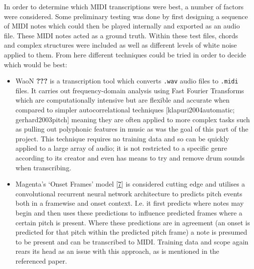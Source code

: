 \documentclass[12pt,]{article}
\providecommand{\tightlist}{%
  \setlength{\itemsep}{0pt}\setlength{\parskip}{0pt}}
\begin{document}
In order to determine which MIDI transcriptions were best, a number of
factors were considered. Some preliminary testing was done by first
designing a sequence of MIDI notes which could then be played internally
and exported as an audio file. These MIDI notes acted as a ground truth.
Within these test files, chords and complex structures were included as
well as different levels of white noise applied to them. From here
different techniques could be tried in order to decide which would be
best:

\begin{itemize}
\tightlist
\item
  WaoN {\textbf{???}} is a transcription tool which converts
  \texttt{.wav} audio files to \texttt{.midi} files. It carries out
  frequency-domain analysis using Fast Fourier Transforms which are
  computationally intensive but are flexible and accurate when compared
  to simpler autocorrelational techniques {[}klapuri2004automatic;
  gerhard2003pitch{]} meaning they are often applied to more complex
  tasks such as pulling out polyphonic features in music as was the goal
  of this part of the project. This technique requires no training data
  and so can be quickly applied to a large array of audio; it is not
  restricted to a specific genre according to its creator and even has
  means to try and remove drum sounds when transcribing.
\item
  Magenta's `Onset Frames' model
  {[}\protect\hyperlink{ref-magentaonsetframes}{7}{]} is considered
  cutting edge and utilises a convolutional recurrent neural network
  architecture to predicts pitch events both in a framewise and onset
  context. I.e. it first predicts where notes may begin and then uses
  these predictions to influence predicted frames where a certain pitch
  is present. Where these predictions are in agreement (an onset is
  predicted for that pitch within the predicted pitch frame) a note is
  presumed to be present and can be transcribed to MIDI. Training data
  and scope again rears its head as an issue with this approach, as is
  mentioned in the referenced paper.
\end{itemize}
\end{document}
